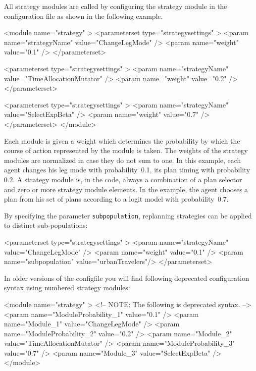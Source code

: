 All strategy modules are called by configuring the strategy module in the configuration file as shown in the following example.
%
\begin{xml}
<module name="strategy" >
	<parameterset type="strategysettings" >
		<param name="strategyName" value="ChangeLegMode" />
		<param name="weight" value="0.1" />
	</parameterset>
	
	<parameterset type="strategysettings" >
		<param name="strategyName" value="TimeAllocationMutator" />
		<param name="weight" value="0.2" />
	</parameterset>
	
	<parameterset type="strategysettings" >
		<param name="strategyName" value="SelectExpBeta" />
		<param name="weight" value="0.7" />
	</parameterset>
</module>
\end{xml}
%
Each module is given a weight which determines the probability by which the course of action represented by the module is taken. The weights of the strategy modules are normalized in case they do not sum to one. In this example, each agent changes his leg mode with probability~0.1, its plan timing with probability 0.2. A strategy module is, in the code, always a combination of a plan selector and zero or more strategy module elements. In the example, the agent chooses a plan from his set of plans according to a logit model with probability~0.7. 

By specifying the parameter \lstinline|subpopulation|, replanning strategies can be applied to distinct sub-populations: \eg
\begin{xml}
	<parameterset type="strategysettings" >
		<param name="strategyName" value="ChangeLegMode" />
		<param name="weight" value="0.1" />
		<param name="subpopulation" value="urbanTravelers"/>
	</parameterset>
\end{xml}

In older versions of the \gls{configfile} you will find following deprecated configuration syntax using numbered strategy modules:
%
\begin{xml}
<module name="strategy" >
    <!-- NOTE: The following is deprecated syntax. -->
    <param name="ModuleProbability_1" value="0.1" /> 
    <param name="Module_1" value="ChangeLegMode" />
    <param name="ModuleProbability_2" value="0.2" />
    <param name="Module_2" value="TimeAllocationMutator" />
    <param name="ModuleProbability_3" value="0.7" />
    <param name="Module_3" value="SelectExpBeta" />
</module>
\end{xml}
%
%
%


